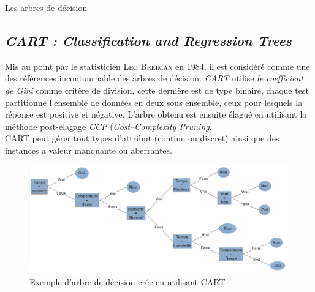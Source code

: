 \documentclass[a4paper, 11pt]{report}
\begin{document}
\begin{chapter}{Les arbres de décision}

\subsection{\emph{CART : Classification and Regression Trees}} 
Mis au point par le statisticien \textsc{Leo Breiman} en 1984, il est considéré comme une des références incontournable des arbres de décision. \emph{CART} utilise \emph{le coefficient de Gini} comme critère de division, cette dernière est de type binaire, chaque test partitionne l'ensemble de données en deux sous ensemble, ceux pour lesquels la réponse est positive et négative. L'arbre obtenu est ensuite élagué en utilisant la méthode post-élagage \emph{CCP} (\emph{Cost–Complexity Pruning}.\\
CART peut gérer tout types d'attribut (continu ou discret) ainsi que des instances a valeur manquante ou aberrantes\cite{Hssina2014ACS}.
\begin{figure}[h!]
\begin{center}
\includegraphics[scale=0.55]{Images/arbre_cart2}
\end{center}
\caption{Exemple d'arbre de décision crée en utilisant CART}
\end{figure}




\end{chapter}
\end{document}
